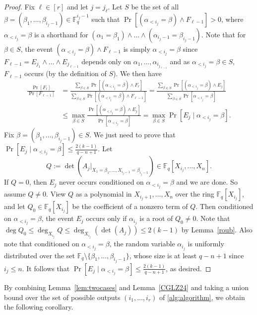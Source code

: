 \documentclass[11pt]{article}
\theoremstyle{plain}
\theoremstyle{definition}
\theoremstyle{remark}
\newcommand{\F}{\mathbb{F}}
\begin{document}
\begin{proof}
Fix $\ell\in [r]$ and let $j=j_\ell$. 
Let  $S$ be the set of all $\beta=(\beta_1,\dots,\beta_{i_{j}-1})\in \F_q^{i_{j}-1}$ such that 
$\Pr\left[\left(\alpha_{<i_{j}}=\beta\right)\wedge F_{\ell-1}\right]>0$,
where $\alpha_{<i_{j}}=\beta$ is a shorthand for  $(\alpha_1=\beta_1)\wedge\dots\wedge (\alpha_{i_{j}-1}=\beta_{i_{j}-1})$.
Note that for $\beta\in S$, the event $\left(\alpha_{<i_{j}}=\beta\right)\wedge F_{\ell-1}$
is simply $\alpha_{<i_{j}}=\beta$ 
since $F_{\ell-1}=E_{j_1}\wedge \dots \wedge E_{j_{\ell-1}}$ depends only on $\alpha_1,\dots,\alpha_{i_{j_{\ell-1}}}$ 
and as $\alpha_{<i_{j}}=\beta\in S$, $F_{\ell-1}$ occurs (by the definition of $S$). 
We then have
\begin{align*}
\frac{\Pr[F_\ell]}{\Pr[F_{\ell-1}]}&=\frac{\sum_{\beta\in S} \Pr\left[\left(\alpha_{<i_{j}}=\beta\right)\wedge F_{\ell}\right]}{\sum_{\beta\in S} \Pr\left[\left(\alpha_{<i_{j}}=\beta\right)\wedge F_{\ell-1}\right]}
=\frac{\sum_{\beta\in S} \Pr\left[\left(\alpha_{<i_{j}}=\beta\right)\wedge  E_{j}\right]}{\sum_{\beta\in S} \Pr\left[ \alpha_{<i_{j}}=\beta \right]}\\
&\leq \max_{\beta\in S}  \frac{ \Pr\left[\left(\alpha_{<i_{j}}=\beta\right)\wedge  E_{j}\right]}{ \Pr\left[ \alpha_{<i_{j}}=\beta \right]}
=\max_{\beta\in S} \Pr\left[  E_{j}\mid \alpha_{<i_{j}}=\beta \right].
\end{align*}
Fix $\beta=(\beta_1,\dots,\beta_{i_{j}-1})\in S$. We just need to prove that $\Pr\left[  E_{j}\mid \alpha_{<i_{j}}=\beta \right]\leq \frac{2(k-1)}{q-n+1}$.
Let \[Q:=\det(A_{j}|_{X_1=\beta_1,\dots,X_{i_j-1}=\beta_{i_{j}-1}})\in\F_q[X_{i_{j}},\dots,X_n].\]
If $Q=0$, then $ E_{j}$ never occurs conditioned on $\alpha_{<i_{j}}=\beta$ and we are done.
So assume  $Q\neq 0$.
View $Q$ as a polynomial in $X_{i_{j}+1},\dots,X_n$ over the ring $\F_q[X_{i_{j}}]$, and let $Q_0\in \F_q[X_{i_{j}}]$ be the coefficient of a nonzero term of $Q$. Then conditioned on $\alpha_{<i_{j}}=\beta$, the event $ E_{j}$ occurs only if $\alpha_{i_{j}}$ is a root of $Q_0\neq 0$.  
Note that $\deg Q_0\leq \deg_{X_{i_{j}}} Q\leq  \deg_{X_{i_{j}}}\left(\det(A_j)\right)\leq 2(k-1)$ by Lemma~\ref{roub}.
Also note that conditioned on $\alpha_{<i_{j}}=\beta$, the random variable $\alpha_{i_{j}}$ is uniformly distributed over the set $\F_q\setminus\{\beta_1,\dots,\beta_{i_{j}-1}\}$, whose size is at least $q-n+1$ since $i_j\leq n$. It follows that $\Pr\left[  E_{j}\mid \alpha_{<i_{j}}=\beta \right]\leq \frac{2(k-1)}{q-n+1}$, as desired.
\end{proof}
By combining Lemma~\ref{lem:twocases} and Lemma~\ref{CGLZ24}  and taking a union bound over the set of possible outputs  $(i_1,\dots,i_r)$ of \cref{alg:algorithm}, we obtain the following corollary.
\end{document}
